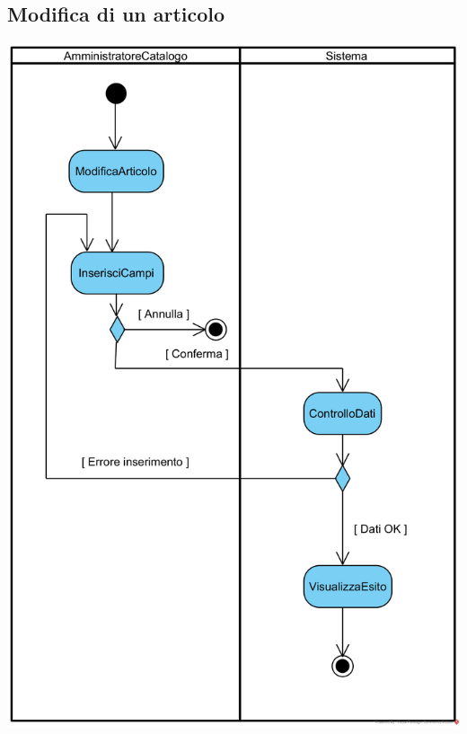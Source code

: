 \documentclass[12pt]{article}
\begin{document}
\subsection{Modifica di un articolo}
\begin{center}
\includegraphics[width=\textwidth]{ActivityDiagram/AmministratoreCatalogoModificaArticoloCatalogo}
\end{center}
\end{document}
